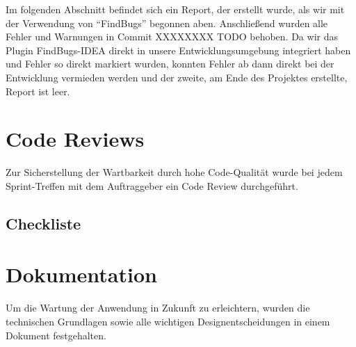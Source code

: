 Im folgenden Abschnitt befindet sich ein Report, der erstellt wurde, als wir mit der Verwendung von ``FindBugs'' begonnen aben. Anschließend wurden alle Fehler und Warnungen in Commit XXXXXXXX TODO behoben. Da wir das Plugin FindBugs-IDEA direkt in unsere Entwicklungsumgebung integriert haben und Fehler so direkt markiert wurden, konnten Fehler ab dann direkt bei der Entwicklung vermieden werden und der zweite, am Ende des Projektes erstellte, Report ist leer.






\clearpage


\section{Code Reviews}

Zur Sicherstellung der Wartbarkeit durch hohe Code-Qualität wurde bei jedem
Sprint-Treffen mit dem Auftraggeber ein Code Review durchgeführt.


\subsection{Checkliste}






\clearpage
\section{Dokumentation}

Um die Wartung der Anwendung in Zukunft zu erleichtern, wurden die technischen Grundlagen
sowie alle wichtigen Designentscheidungen in einem Dokument festgehalten.

